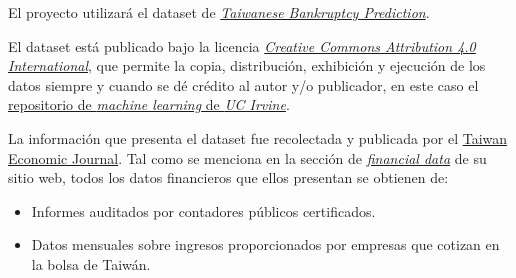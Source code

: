 \documentclass[
11pt, %
]{charter}
\begin{document}


El proyecto utilizará el dataset de \href{https://archive.ics.uci.edu/dataset/572/taiwanese+bankruptcy+prediction}{\textit{Taiwanese Bankruptcy Prediction}}.

El dataset está publicado bajo la licencia \href{https://creativecommons.org/licenses/by/4.0/legalcode}{\textit{Creative Commons Attribution 4.0 International}}, que permite la copia, distribución, exhibición y ejecución de los datos siempre y cuando se dé crédito al autor y/o publicador, en este caso el \href{https://archive.ics.uci.edu/}{repositorio de \textit{machine learning} de \textit{UC Irvine}}.

La información que presenta el dataset fue recolectada y publicada por el \href{https://www.tejwin.com/en/}{Taiwan Economic Journal}. Tal como se menciona en la sección de \href{https://www.tejwin.com/en/solution/financial-data/}{\textit{financial data}} de su sitio web, todos los datos financieros que ellos presentan se obtienen de:
\begin{itemize}
    \item Informes auditados por contadores públicos certificados.
    \item Datos mensuales sobre ingresos proporcionados por empresas que cotizan en la bolsa de Taiwán.
\end{itemize}
\end{document}
